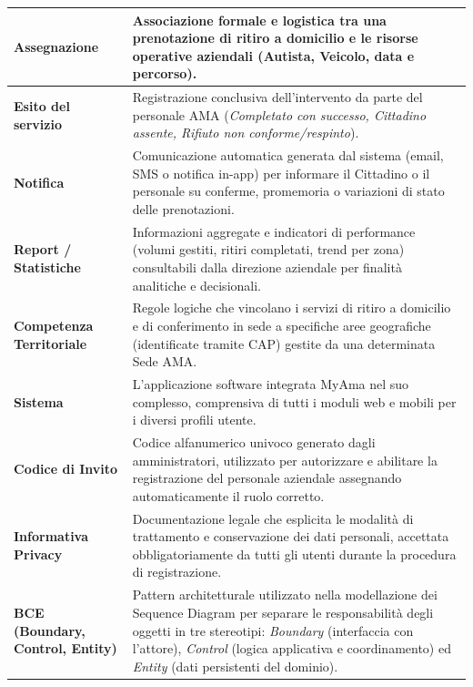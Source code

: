 \begin{center}
\begin{longtable}{|p{4.2cm}|p{10.5cm}|}
\textbf{Assegnazione} & Associazione formale e logistica tra una prenotazione di ritiro a domicilio e le risorse operative aziendali (Autista, Veicolo, data e percorso). \\ \hline

\textbf{Esito del servizio} & Registrazione conclusiva dell'intervento da parte del personale AMA (\textit{Completato con successo, Cittadino assente, Rifiuto non conforme/respinto}). \\ \hline

\textbf{Notifica} & Comunicazione automatica generata dal sistema (email, SMS o notifica in-app) per informare il Cittadino o il personale su conferme, promemoria o variazioni di stato delle prenotazioni. \\ \hline

\textbf{Report / Statistiche} & Informazioni aggregate e indicatori di performance (volumi gestiti, ritiri completati, trend per zona) consultabili dalla direzione aziendale per finalità analitiche e decisionali. \\ \hline

\textbf{Competenza Territoriale} & Regole logiche che vincolano i servizi di ritiro a domicilio e di conferimento in sede a specifiche aree geografiche (identificate tramite CAP) gestite da una determinata Sede AMA. \\ \hline

\textbf{Sistema} & L'applicazione software integrata MyAma nel suo complesso, comprensiva di tutti i moduli web e mobili per i diversi profili utente. \\ \hline

\textbf{Codice di Invito} & Codice alfanumerico univoco generato dagli amministratori, utilizzato per autorizzare e abilitare la registrazione del personale aziendale assegnando automaticamente il ruolo corretto. \\ \hline

\textbf{Informativa Privacy} & Documentazione legale che esplicita le modalità di trattamento e conservazione dei dati personali, accettata obbligatoriamente da tutti gli utenti durante la procedura di registrazione. \\ \hline

\textbf{BCE (Boundary, Control, Entity)} & Pattern architetturale utilizzato nella modellazione dei Sequence Diagram per separare le responsabilità degli oggetti in tre stereotipi: \textit{Boundary} (interfaccia con l'attore), \textit{Control} (logica applicativa e coordinamento) ed \textit{Entity} (dati persistenti del dominio). \\ \hline


\end{longtable}
\end{center}
